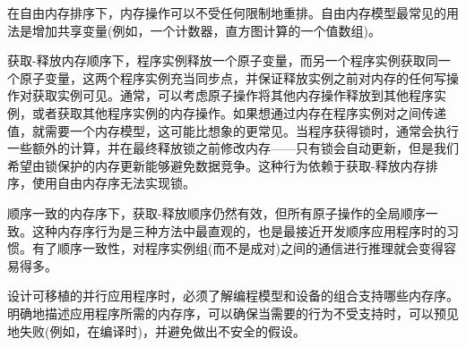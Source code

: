 在自由内存排序下，内存操作可以不受任何限制地重排。自由内存模型最常见的用法是增加共享变量(例如，一个计数器，直方图计算的一个值数组)。\par

获取-释放内存顺序下，程序实例释放一个原子变量，而另一个程序实例获取同一个原子变量，这两个程序实例充当同步点，并保证释放实例之前对内存的任何写操作对获取实例可见。通常，可以考虑原子操作将其他内存操作释放到其他程序实例，或者获取其他程序实例的内存操作。如果想通过内存在程序实例对之间传递值，就需要一个内存模型，这可能比想象的更常见。当程序获得锁时，通常会执行一些额外的计算，并在最终释放锁之前修改内存——只有锁会自动更新，但是我们希望由锁保护的内存更新能够避免数据竞争。这种行为依赖于获取-释放内存排序，使用自由内存序无法实现锁。\par

顺序一致的内存序下，获取-释放顺序仍然有效，但所有原子操作的全局顺序一致。这种内存序行为是三种方法中最直观的，也是最接近开发顺序应用程序时的习惯。有了顺序一致性，对程序实例组(而不是成对)之间的通信进行推理就会变得容易得多。\par

设计可移植的并行应用程序时，必须了解编程模型和设备的组合支持哪些内存序。明确地描述应用程序所需的内存序，可以确保当需要的行为不受支持时，可以预见地失败(例如，在编译时)，并避免做出不安全的假设。\par







































